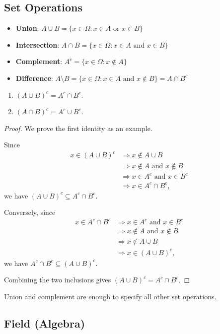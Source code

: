 \subsection{Set Operations}

\begin{itemize}
\item \textbf{Union}:
$A\cup B=\{x\in\Omega:x\in A\text{ or }x\in B\}$
\item \textbf{Intersection}:
$A\cap B=\{x\in\Omega:x\in A\text{ and }x\in B\}$
\item \textbf{Complement}:
$A^c=\{x\in\Omega:x\notin A\}$
\item \textbf{Difference}:
$A \setminus B =
\{x\in\Omega:x\in A \text{ and } x\notin B\}
= A\cap B^c$
\end{itemize}

\begin{remark}\begin{enumerate}
\item $(A\cup B)^c=A^c\cap B^c$.
\item $(A\cap B)^c=A^c\cup B^c$.
\end{enumerate}

\end{remark}\begin{proof}We prove the first identity as an example.

Since
\begin{align*}
   x\in(A\cup B)^c
   &\Rightarrow x\notin A\cup B \\
   &\Rightarrow x\notin A\text{ and }x\notin B \\
   &\Rightarrow x\in A^c\text{ and }x\in B^c \\
   &\Rightarrow x\in A^c\cap B^c,
   \end{align*}
we have $(A\cup B)^c\subseteq A^c\cap B^c$.

Conversely, since
\begin{align*}
   x\in A^c\cap B^c
   &\Rightarrow x\in A^c\text{ and }x\in B^c \\
   &\Rightarrow x\notin A\text{ and }x\notin B \\
   &\Rightarrow x\notin A\cup B \\
   &\Rightarrow x\in(A\cup B)^c,
   \end{align*}
we have $A^c\cap B^c\subseteq(A\cup B)^c$.

Combining the two inclusions gives
$(A\cup B)^c=A^c\cap B^c$.

\end{proof}\begin{remark}Union and complement are enough to specify all other set operations.

\end{remark}\subsection{Field (Algebra)}

